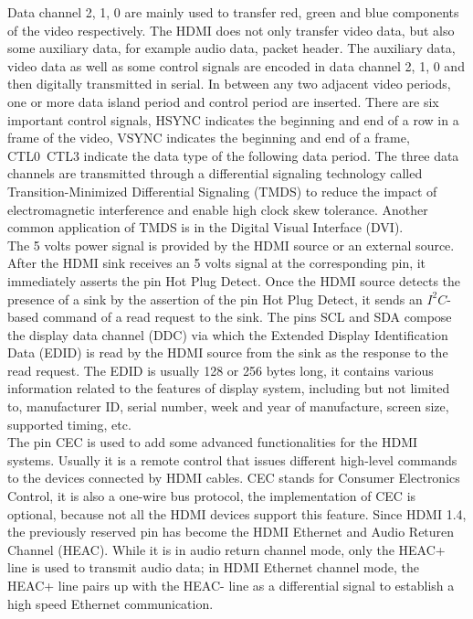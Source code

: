 \documentclass[]{spie}  %
\begin{document}
Data channel 2, 1, 0 are mainly used to transfer red, green and blue components of the video respectively. The HDMI does not only transfer video data, but also some auxiliary data, for example audio data, packet header. The auxiliary data, video data as well as some control signals are encoded in data channel 2, 1, 0 and then digitally transmitted in serial. In between any two adjacent video periods, one or more data island period and control period are inserted. There are six important control signals, HSYNC indicates the beginning and end of a row in a frame of the video, VSYNC indicates the beginning and end of a frame, CTL0~CTL3 indicate the data type of the following data period. The three data channels are transmitted through a differential signaling technology called Transition-Minimized Differential Signaling (TMDS) to reduce the impact of electromagnetic interference and enable high clock skew tolerance. Another common application of TMDS is in the Digital Visual Interface (DVI).\\
The 5 volts power signal is provided by the HDMI source or an external source. After the HDMI sink receives an 5 volts signal at the corresponding pin, it immediately asserts the pin Hot Plug Detect. Once the HDMI source detects the presence of a sink by the assertion of the pin Hot Plug Detect, it sends an $I^2C$-based command of a read request to the sink. The pins SCL and SDA compose the display data channel (DDC) via which the Extended Display Identification Data (EDID) is read by the HDMI source from the sink as the response to the read request. The EDID is usually 128 or 256 bytes long, it contains various information related to the features of display system, including but not limited to, manufacturer ID, serial number, week and year of manufacture, screen size, supported timing, etc.\\
The pin CEC is used to add some advanced functionalities for the HDMI systems. Usually it is a remote control that issues different high-level commands to the devices connected by HDMI cables. CEC stands for Consumer Electronics Control, it is also a one-wire bus protocol, the implementation of CEC is optional, because not all the HDMI devices support this feature. Since HDMI 1.4, the previously reserved pin has become the HDMI Ethernet and Audio Returen Channel (HEAC). While it is in audio return channel mode, only the HEAC+ line is used to transmit audio data; in HDMI Ethernet channel mode, the HEAC+ line pairs up with the HEAC- line as a differential signal to establish a high speed Ethernet communication.
\end{document}
